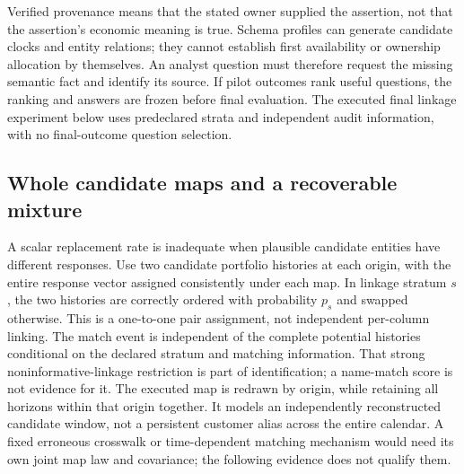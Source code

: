 Verified provenance means that the stated owner supplied the assertion, not
that the assertion's economic meaning is true. Schema profiles can generate
candidate clocks and entity relations; they cannot establish first
availability or ownership allocation by themselves. An analyst question
must therefore request the missing semantic fact and identify its source.
If pilot outcomes rank useful questions, the ranking and answers are frozen
before final evaluation. The executed final linkage experiment below uses
predeclared strata and independent audit information, with no final-outcome
question selection.

\subsection{Whole candidate maps and a recoverable mixture}
A scalar replacement rate is inadequate when plausible candidate entities
have different responses. Use two candidate portfolio histories at each
origin, with the entire response vector assigned consistently under each
map. In linkage stratum $s$, the two histories are correctly ordered with
probability $p_s$ and swapped otherwise. This is a one-to-one pair assignment,
not independent per-column linking. The match event is independent of the
complete potential histories conditional on the declared stratum and
matching information. That strong noninformative-linkage restriction is
part of identification; a name-match score is not evidence for it.
The executed map is redrawn by origin, while retaining all horizons within
that origin together. It models an independently reconstructed candidate
window, not a persistent customer alias across the entire calendar. A fixed
erroneous crosswalk or time-dependent matching mechanism would need its own
joint map law and covariance; the following evidence does not qualify them.

